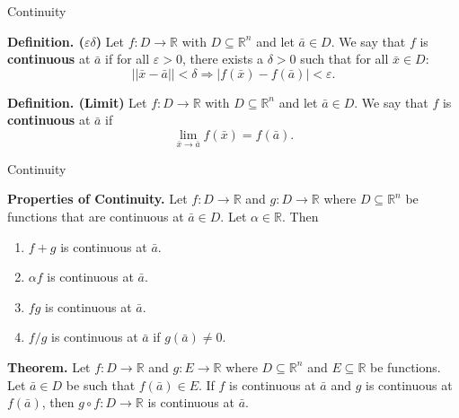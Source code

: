 \documentclass[aspectratio=169, UTF8]{ctexbeamer}
\begin{document}
    \begin{frame}[t]{Continuity}
        \begin{block}
            \par \textbf{Definition. ($\varepsilon \delta$)} Let $f: D \to \mathbb{R}$ with $D \subseteq \mathbb{R}^n$ and let $\bar{a} \in D$. We say that $f$ is \textbf{continuous} at $\bar{a}$ if for all $\varepsilon > 0$, there exists a $\delta > 0$ such that for all $\bar{x} \in D$:
            \begin{equation*}
                || \bar{x} - \bar{a} || < \delta \Rightarrow | f(\bar{x}) - f(\bar{a}) | < \varepsilon .
            \end{equation*}

            \par \textbf{Definition. (Limit)} Let $f: D \to \mathbb{R}$ with $D \subseteq \mathbb{R}^n$ and let $\bar{a} \in D$. We say that $f$ is \textbf{continuous} at $\bar{a}$ if
            \begin{equation*}
                \lim\limits_{\bar{x} \to \bar{a}} f(\bar{x}) = f(\bar{a}) .
            \end{equation*}
        \end{block}
    \end{frame}

    \begin{frame}[t]{Continuity}
        \begin{block}
            \par \textbf{Properties of Continuity.} Let $f: D \to \mathbb{R}$ and $g: D \to \mathbb{R}$ where $D \subseteq \mathbb{R}^n$ be functions that are continuous at $\bar{a} \in D$. Let $\alpha \in \mathbb{R}$. Then 
            \begin{enumerate}
                \item $f+g$ is continuous at $\bar{a}$.
                \item $\alpha f$ is continuous at $\bar{a}$.
                \item $fg$ is continuous at $\bar{a}$.
                \item $f/g$ is continuous at $\bar{a}$ if $g(\bar{a}) \neq 0$.
            \end{enumerate}
        \end{block}
        \begin{block}
            \par \textbf{Theorem.} Let $f: D \to \mathbb{R}$ and $g: E \to \mathbb{R}$ where $D \subseteq \mathbb{R}^n$ and $E \subseteq \mathbb{R}$ be functions. Let $\bar{a} \in D$ be such that $f(\bar{a}) \in E$. If $f$ is continuous at $\bar{a}$ and $g$ is continuous at $f(\bar{a})$, then $g \circ f : D \to \mathbb{R}$ is continuous at $\bar{a}$.
        \end{block}
    \end{frame}
\end{document}
